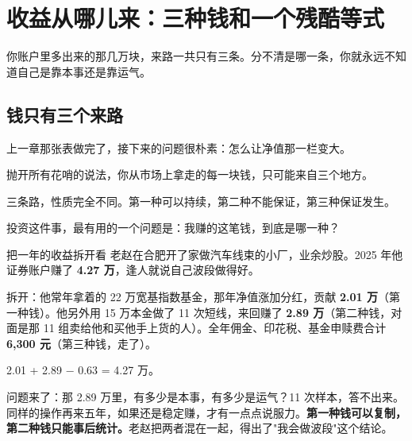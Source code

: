 \chapter{收益从哪儿来：三种钱和一个残酷等式}

\begin{ledetext}
你账户里多出来的那几万块，来路一共只有三条。分不清是哪一条，你就永远不知道自己是靠本事还是靠运气。
\end{ledetext}

\section{钱只有三个来路}

上一章那张表做完了，接下来的问题很朴素：怎么让净值那一栏变大。

抛开所有花哨的说法，你从市场上拿走的每一块钱，只可能来自三个地方。

\begin{flowlist}
\end{flowlist}

三条路，性质完全不同。第一种可以持续，第二种不能保证，第三种保证发生。

\begin{pullquote}{}
投资这件事，最有用的一个问题是：我赚的这笔钱，到底是哪一种？
\end{pullquote}

\begin{egbox}{把一年的收益拆开看}
老赵在合肥开了家做汽车线束的小厂，业余炒股。2025 年他证券账户赚了 \textbf{4.27 万}，逢人就说自己波段做得好。

拆开：他常年拿着的 22 万宽基指数基金，那年净值涨加分红，贡献 \textbf{2.01 万}（第一种钱）。他另外用 15 万本金做了 11 次短线，来回赚了 \textbf{2.89 万}（第二种钱，对面是那 11 组卖给他和买他手上货的人）。全年佣金、印花税、基金申赎费合计 \textbf{6,300 元}（第三种钱，走了）。

2.01 + 2.89 − 0.63 = 4.27 万。

问题来了：那 2.89 万里，有多少是本事，有多少是运气？11 次样本，答不出来。同样的操作再来五年，如果还是稳定赚，才有一点点说服力。\textbf{第一种钱可以复制，第二种钱只能事后统计。}老赵把两者混在一起，得出了"我会做波段"这个结论。

\end{egbox}

